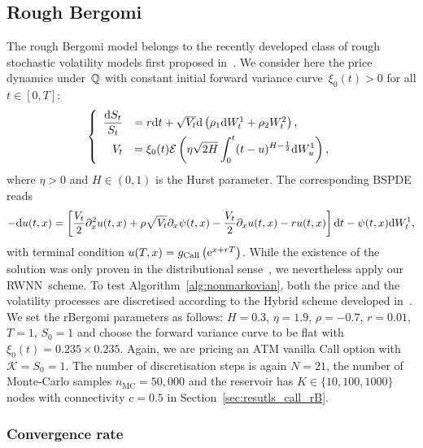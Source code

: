 \subsection{Rough Bergomi}
The rough Bergomi model belongs to the recently developed class of rough stochastic volatility models first proposed in~\cite{Bayer2015PricingVolatility, Gatheral2018VolatilityRough, Guennoun2018AsymptoticModel}. We consider here the price dynamics under~$\mathbb{Q}$ with constant initial forward variance curve~$\xi_0(t)>0$ for all $t\in[0,T]$:
\begin{equation*}
\left\{
\begin{array}{rl}
\displaystyle\frac{\mathrm{d} S_t}{S_t} &= r \mathrm{d} t + \sqrt{V_t} \mathrm{d} \left(\rho_1\mathrm{d} W^1_t + \rho_2 W^2_t\right), \\
V_t &= \displaystyle \xi_0(t)\mathcal{E}\left( \eta\sqrt{2H} \int_0^t (t-u)^{H-\frac{1}{2}} \mathrm{d} W_u^1 \right),
\end{array}
\right.
\end{equation*}
where $\eta>0$ and $H\in(0,1)$ is the Hurst parameter. 
The corresponding BSPDE reads
\begin{equation}\label{eq:roughBergomi}
-\mathrm{d} u(t,x) = \left[\frac{V_{t}}{2} \partial_x^{2} u(t, x)+\rho \sqrt{V_{t}} \partial_x \psi(t,x)-\frac{V_{t}}{2} \partial_x u(t,x)-r u(t,x)\right] \mathrm{d} t-\psi(t,x) \mathrm{d} W^1_{t},
\end{equation}
with terminal condition $u(T, x) = g_{\textup{Call}}\left(\mathrm{e}^{x+r T}\right)$. 
While the existence of the solution  was only proven in the distributional sense~\cite{Bayer2022PricingSPDEs}, we nevertheless apply our RWNN~scheme.
To test Algorithm~\ref{alg:nonmarkovian}, both the price and the volatility processes are discretised according to the Hybrid scheme developed in~\cite{Bennedsen2017HybridProcesses, McCrickerd2018TurbochargingModel}. 
We set the rBergomi parameters as follows: $H=0.3$, $\eta=1.9$, $\rho=-0.7$, $r=0.01$, $T=1$, $S_0=1$ and choose the forward variance curve to be flat with $\xi_0(t) = 0.235\times 0.235$. Again, we are pricing an ATM vanilla Call option with $\mathscr K=S_0=1$. The number of discretisation steps is again $N=21$, the number of Monte-Carlo samples $n_{\mathrm{MC}}=50,000$ and the reservoir has $K\in\{10, 100, 1000\}$ nodes with connectivity $c=0.5$ in Section~\ref{sec:resutls_call_rB}. 

\subsubsection{Convergence rate}\label{sec:rB_convergence_rate}

